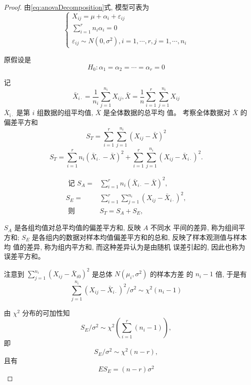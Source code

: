 \begin{proof}
    由\cref{eq:anovaDecomposition}式, 模型可表为
    $$
    \left\{\begin{array}{l}
    {X}_{i j}=\mu+\alpha_{i}+\varepsilon_{i j} \\
    \sum_{i=1}^{r} {n}_{i} \alpha_{i}={0} \\
    \varepsilon_{i j} \sim N\left({0}, \sigma^{2}\right), i=1, \cdots, r, j=1, \cdots, n_{i}
    \end{array}\right.
    $$
    
    原假设是
    $$
    H_{0}: \alpha_{1}=\alpha_{2}=\cdots=\alpha_{r}=0
    $$
    
    记
    $$
    \bar{X}_{i \cdot}=\frac{1}{n_{i}} \sum_{j=1}^{n_{i}} X_{i j}, \bar{X}=\frac{1}{n} \sum_{i=1}^{r} \sum_{j=1}^{n_{i}} X_{i j}
    $$
    \( \overline{{X}}_{\mathrm{i} \cdot} \) 是第 \( {i} \) 组数据的组平均值, \( \overline{{X}} \) 是全体数据的总平均
    值。 考察全体数据对 \( \bar{X} \) 的偏差平方和
    $$
    S_{T}=\sum_{i=1}^{r} \sum_{j=1}^{n_{i}}\left(X_{i j}-\bar{X}\right)^{2}
    $$
    $$
    S_{T}=\sum_{i=1}^{r} n_{i}\left(\bar{X}_{i \cdot}-\bar{X}\right)^{2}+\sum_{i=1}^{r} \sum_{j=1}^{n_{i}}\left(X_{i j}-\bar{X}_{i \cdot}\right)^{2} .
    $$
    
    $$ \begin{aligned} \text { 记 } S_{A}=& \sum_{i=1}^{r} n_{i}\left(\bar{X}_{i \cdot}-\bar{X}\right)^{2}, \\ S_{E}=& \sum_{i=1}^{r} \sum_{j=1}^{n_{i}}\left(X_{i j}-\bar{X}_{i \cdot}\right)^{2}, \\ \text { 则 } & S_{T}=S_{A}+S_{E}, \end{aligned} $$
    
    \( {S}_{{A}} \) 是各组均值对总平均值的偏差平方和, 反映 \( {A} \) 不同水
    平间的差异, 称为组间平方和; \( {S}_{E} \) 是各组内的数据对样本均值偏差平方和的总和, 反映了样本观测值与样本均
    值的差异, 称为组内平方和, 而这种差异认为是由随机
    误差引起的, 因此也称为误差平方和。 
    
    注意到 \( \sum_{j=1}^{n_{i}}\left(X_{i j}-\bar{X}_{i 0}\right)^{2} \) 是总体 \( N\left(\mu_{i}, \sigma^{2}\right) \) 的样本方差
    的 \( {n}_{{i}}-{1} \) 倍, 于是有
    $$
    \sum_{j=1}^{n_{i}}\left(X_{i j}-\bar{X}_{i \cdot}\right)^{2} / \sigma^{2} \sim \chi^{2}\left(n_{i}-1\right)
    $$
    
    由 \( \chi^{2} \) 分布的可加性知
    $$
    S_{E} / \sigma^{2} \sim \chi^{2}\left(\sum_{i=1}^{r}\left(n_{i}-1\right)\right),
    $$
    即
    $$
    {S}_{E} / \sigma^{2} \sim \chi^{2}({n}-{r}),
    $$
    且有
    $$
    E S_{E}=(n-r) \sigma^{2}
    $$
    

\end{proof}
